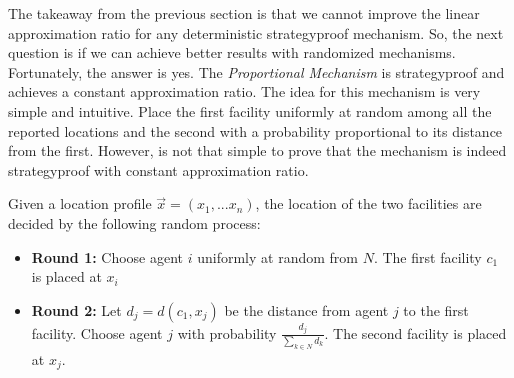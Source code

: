The takeaway from the previous section is that we cannot improve the linear approximation ratio for any deterministic strategyproof mechanism. So, the next question is if we can achieve better results with randomized mechanisms. Fortunately, the answer is yes. The \emph{Proportional Mechanism} \cite{Lu2010} is strategyproof and achieves a constant approximation ratio. The idea for this mechanism is very simple and intuitive. Place the first facility uniformly at random among all the reported locations and the second with a probability proportional to its distance from the first. However, is not that simple to prove that the mechanism is indeed strategyproof with constant approximation ratio.

\begin{definition}

Given a location profile $\vec{x}=(x_1,...x_n)$, the location of the two facilities are decided by the following random process:
\begin{itemize}
    \item\textbf{Round 1:} Choose agent $i$ uniformly at random from $N$. The first facility $c_1$ is placed at $x_i$

    \item\textbf{Round 2:} Let $d_j = d(c_1,x_j)$ be the distance from agent $j$ to the first facility. Choose agent $j$ with probability $\frac{d_j}{\sum_{k\in N}d_k}$. The second facility is placed at $x_j$.

\end{itemize}
\end{definition}




